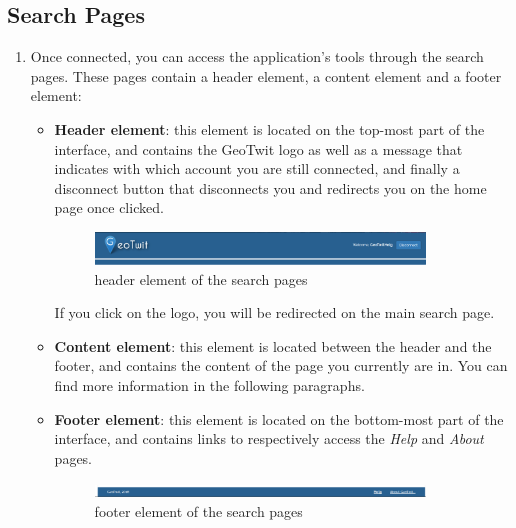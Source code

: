 \documentclass[a4paper,11pt]{report}
\begin{document}
\subsection{Search Pages}
\begin{enumerate}
	\item Once connected, you can access the application's tools through the search pages. These pages contain a header element, a content element and a footer element:
	\begin{itemize}
		\item \textbf{Header element}: this element is located on the top-most part of the interface, and contains the GeoTwit logo as well as a message that indicates with which account you are still connected, and finally a disconnect button that disconnects you and redirects you on the home page once clicked.
		\begin{figure}[H]
		\vspace{-5pt}
		\begin{center}
		\includegraphics[width=0.88\textwidth, right]{figures/header.png}
		\vspace{-20pt}
		\caption{header element of the search pages}
		\end{center}
		\end{figure}
		\vspace{-10pt}
		
		If you click on the logo, you will be redirected on the main search page.
		
		\item \textbf{Content element}: this element is located between the header and the footer, and contains the content of the page you currently are in. You can find more information in the following paragraphs.
		\item \textbf{Footer element}: this element is located on the bottom-most part of the interface, and contains links to respectively access the \emph{Help} and \emph{About} pages.
		\begin{figure}[H]
		\vspace{-5pt}
		\begin{center}
		\includegraphics[width=0.88\textwidth, right]{figures/footer.png}
		\vspace{-20pt}
		\caption{footer element of the search pages}
		\end{center}
		\end{figure}
		\vspace{-10pt}
	\end{itemize}
	

\end{enumerate}
\end{document}
